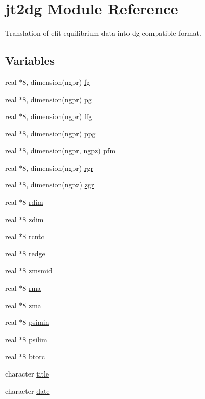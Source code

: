 \hypertarget{namespacejt2dg}{
\section{jt2dg Module Reference}
\label{namespacejt2dg}
}
Translation of efit equilibrium data into dg-compatible format.  


\subsection*{Variables}
\begin{CompactItemize}
\item 
real $\ast$8, dimension(ngpr) \hyperlink{namespacejt2dg_17c615f62c0c05b808d87246266ab536}{fg}
\item 
real $\ast$8, dimension(ngpr) \hyperlink{namespacejt2dg_08d804a6c5152c65e1500244fa1410f6}{pg}
\item 
real $\ast$8, dimension(ngpr) \hyperlink{namespacejt2dg_80fab5edf3704e21b81149c9e637f497}{ffg}
\item 
real $\ast$8, dimension(ngpr) \hyperlink{namespacejt2dg_6f762b87bc8dd1ed612d879909319f97}{ppg}
\item 
real $\ast$8, dimension(ngpr, ngpz) \hyperlink{namespacejt2dg_b7a37a375ca78999b17c11ceea0bec58}{pfm}
\item 
real $\ast$8, dimension(ngpr) \hyperlink{namespacejt2dg_b4d8b9997f9926f576c02a07ccc16176}{rgr}
\item 
real $\ast$8, dimension(ngpz) \hyperlink{namespacejt2dg_60cde3de8e847fbf8f420fe9ce5f465d}{zgr}
\item 
real $\ast$8 \hyperlink{namespacejt2dg_b4ad724a904b761b05f1d0fe6ce382b8}{rdim}
\item 
real $\ast$8 \hyperlink{namespacejt2dg_4e55ac9b9c6c4c69545058d6b2194852}{zdim}
\item 
real $\ast$8 \hyperlink{namespacejt2dg_c556fd21d38d2c16cf2084c07b3c0c20}{rcntc}
\item 
real $\ast$8 \hyperlink{namespacejt2dg_b1344521a6c6c72af5caecd650ebe2f6}{redge}
\item 
real $\ast$8 \hyperlink{namespacejt2dg_201bfea2375282f6c8c0fd2b5c51a3fa}{zmsmid}
\item 
real $\ast$8 \hyperlink{namespacejt2dg_ab82ffdff1e4668d4385405aa75ccd89}{rma}
\item 
real $\ast$8 \hyperlink{namespacejt2dg_61fcb02be858569f8d4d26baf5a40611}{zma}
\item 
real $\ast$8 \hyperlink{namespacejt2dg_c9e6897e44c92cd87f08bc39a66d332e}{psimin}
\item 
real $\ast$8 \hyperlink{namespacejt2dg_14f47c1ae6f543fcfb7074e1fa879656}{psilim}
\item 
real $\ast$8 \hyperlink{namespacejt2dg_4d893dd31631d4c355e8ed3d4be79dd7}{btorc}
\item 
character \hyperlink{namespacejt2dg_c32ba1b009dff05e5ec89ca21de79ee1}{title}
\item 
character \hyperlink{namespacejt2dg_98bd4e896161de789c7c592b8d610eb2}{date}
\end{CompactItemize}


